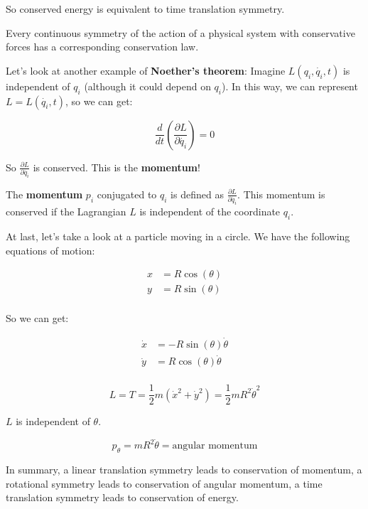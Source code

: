 So conserved energy is equivalent to time translation symmetry.

\begin{definition}
    Every continuous symmetry of the action of a physical system with conservative forces has a corresponding conservation law.
\end{definition}

Let's look at another example of \textbf{Noether's theorem}: Imagine $L(q_i, \dot{q_i}, t)$ is 
independent of $q_i$ (although it could depend on $q_i$). In this way, we can represent 
$L=L(\dot{q_i}, t)$, so we can get:

\[
    \frac{d}{dt} \left(\frac{\partial L}{\partial \dot{q_i}}\right) = 0
\]

So $\frac{\partial L}{\partial \dot{q_i}}$ is conserved. This is the \textbf{momentum}!

\begin{definition}[Momentum]
    The \textbf{momentum} $p_i$ conjugated to $q_i$ is defined as $\frac{\partial L}{\partial \dot{q_i}}$.
    This momentum is conserved if the Lagrangian $L$ is independent of the coordinate $q_i$.
\end{definition}

At last, let's take a look at a particle moving in a circle. We have the following equations of motion:

\begin{align*}
    x&=R\cos(\theta)\\
    y&=R\sin(\theta)\\
\end{align*}

So we can get:

\begin{align*}
    \dot{x}&=-R\sin(\theta)\dot{\theta}\\
    \dot{y}&=R\cos(\theta)\dot{\theta}\\
\end{align*}

\[
    L = T = \frac{1}{2} m (\dot{x}^2+\dot{y}^2) = \frac{1}{2} m R^2 \dot{\theta}^2
\]

$L$ is independent of $\theta$.

\[
    p_\theta =  m R^2 \dot{\theta} = \text{angular momentum}
\]

In summary, a linear translation symmetry leads to conservation of momentum, a 
rotational symmetry leads to conservation of angular momentum, a time translation
symmetry leads to conservation of energy.